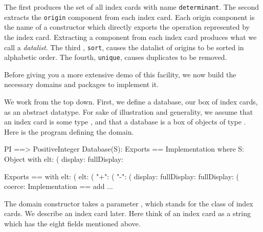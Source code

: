 {{{{{{{The first  produces the set of all index cards with
name {\tt determinant}.
The second  extracts the {\tt origin} component from
each index card. Each origin component
is the name of a constructor which directly
exports the operation represented by the index card.
Extracting a component from each index card produces what we call
a {\it datalist}.
The third , {\tt sort}, causes the datalist of
origins to be sorted in alphabetic
order.
The fourth, {\tt unique}, causes duplicates to be removed.

Before giving you a more extensive demo of this facility,
we now build the necessary domains and packages to implement it.


We work from the top down. First, we define a database,
our box of index cards, as an abstract datatype.
For sake of illustration and generality,
we assume that an index card is some type , and
that a database is a box of objects of type .
Here is the \Language{} program defining the 
domain.

\begin{xmpLines}
PI ==> PositiveInteger
Database(S): Exports == Implementation where
  S: Object with
    elt: (%
    display: %
    fullDisplay: %

  Exports == with
    elt: (%
    elt: (%
    "+": (%
    "-": (%
    display: %
    fullDisplay: %
    fullDisplay: (%
    coerce: %
  Implementation == add
      ...
\end{xmpLines}

The domain constructor takes a parameter , which
stands for the class of index cards.
We describe an index card later.
Here think of an index card as a string which has
the eight fields mentioned above.

}}}}}}}
